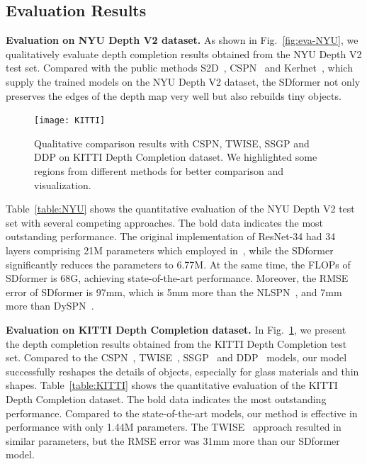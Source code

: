 \documentclass[conference]{IEEEtran}
\begin{document}
\subsection{Evaluation Results}
\textbf{Evaluation on NYU Depth V2 dataset.} As shown in Fig.~\ref{fig:eva-NYU}, we qualitatively evaluate depth completion results obtained from the NYU Depth V2 test set. Compared with the public methods S2D~\cite{b30}, CSPN~\cite{b17} and Kerlnet~\cite{b31}, which supply the trained models on the NYU Depth V2 dataset, the SDformer not only preserves the edges of the depth map very well but also rebuilds tiny objects.
\begin{figure}[htbp]
\centerline{\texttt{[image: KITTI]}}
\caption{Qualitative comparison results with CSPN, TWISE, SSGP and DDP on KITTI Depth Completion dataset. We highlighted some regions from different methods for better comparison and visualization. }
\label{fig:example4}
\end{figure}
Table~\ref{table:NYU} shows the quantitative evaluation of the NYU Depth V2 test set with several competing approaches. The bold data indicates the most outstanding performance. The original implementation of ResNet-34 had 34 layers comprising 21M parameters which employed in~\cite{b17,b18,b19,b21,b33}, while the SDformer significantly reduces the parameters to 6.77M. At the same time, the FLOPs of SDformer is 68G, achieving state-of-the-art performance. Moreover, the RMSE error of SDformer is 97mm, which is 5mm more than the NLSPN~\cite{b19}, and 7mm more than DySPN~\cite{b21}.

\textbf{Evaluation on KITTI Depth Completion dataset.} In Fig.~\ref{fig:example4}, we present the depth completion results obtained from the KITTI Depth Completion test set. Compared to the CSPN~\cite{b17}, TWISE~\cite{b36}, SSGP~\cite{b14} and DDP~\cite{b38} models, our model successfully reshapes the details of objects, especially for glass materials and thin shapes.
Table~\ref{table:KITTI} shows the quantitative evaluation of the KITTI Depth Completion dataset. The bold data indicates the most outstanding performance. Compared to the state-of-the-art models, our method is effective in performance with only 1.44M parameters. The TWISE~\cite{b36} approach resulted in similar parameters, but the RMSE error was 31mm more than our SDformer model. 
\end{document}
